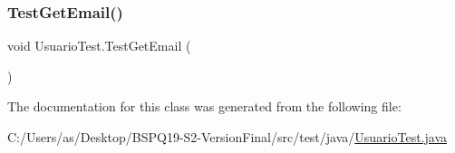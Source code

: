 \mbox{\label{class_usuario_test_a1edbba82e373eca6120a82cf9e35ab69}} 
\subsubsection{\texorpdfstring{TestGetEmail()}{TestGetEmail()}}
{\footnotesize\ttfamily void Usuario\+Test.\+Test\+Get\+Email (\begin{DoxyParamCaption}{ }\end{DoxyParamCaption})}



The documentation for this class was generated from the following file\+:\begin{DoxyCompactItemize}
\item 
C\+:/\+Users/as/\+Desktop/\+B\+S\+P\+Q19-\/\+S2-\/\+Version\+Final/src/test/java/\mbox{\hyperlink{_usuario_test_8java}{Usuario\+Test.\+java}}\end{DoxyCompactItemize}
